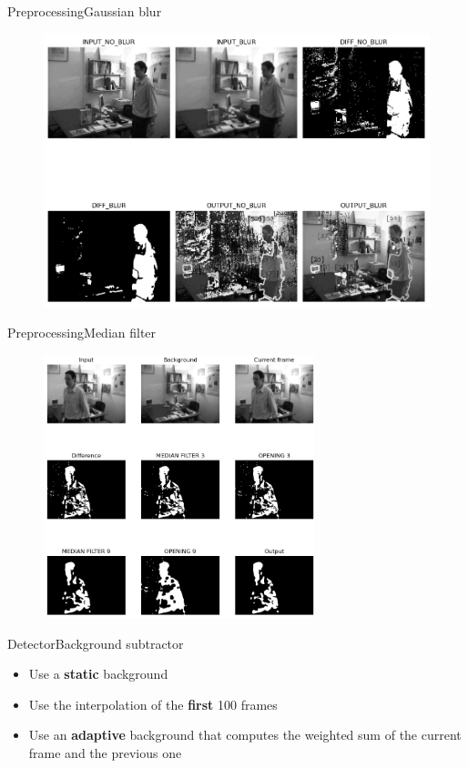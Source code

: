 \documentclass{beamer}
\begin{document}
\begin{frame}{Preprocessing}{Gaussian blur}
    \begin{figure}
        \includegraphics[width=\linewidth,keepaspectratio]{background_no_gaussian.PNG}
    \end{figure}
\end{frame}

\begin{frame}{Preprocessing}{Median filter}
    \begin{figure}
        \includegraphics[width=0.7\textwidth,keepaspectratio]{median filter.png}
    \end{figure}
\end{frame}


\begin{frame}{Detector}{Background subtractor}
    \begin{itemize}
        \item Use a \textbf{static} background\
        \item Use the interpolation of the \textbf{first} 100 frames
        \item Use an \textbf{adaptive} background that computes the weighted sum of the current frame and the previous one
    \end{itemize}
\end{frame}
\end{document}
